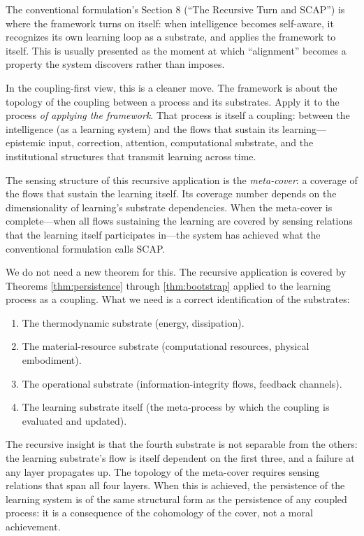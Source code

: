 \documentclass[11pt]{article}
\theoremstyle{definition}
\theoremstyle{remark}
\begin{document}
The conventional formulation's Section 8 (``The Recursive Turn and SCAP'') is where the framework turns on itself: when intelligence becomes self-aware, it recognizes its own learning loop as a substrate, and applies the framework to itself. This is usually presented as the moment at which ``alignment'' becomes a property the system discovers rather than imposes.

In the coupling-first view, this is a cleaner move. The framework is about the topology of the coupling between a process and its substrates. Apply it to the process \emph{of applying the framework}. That process is itself a coupling: between the intelligence (as a learning system) and the flows that sustain its learning---epistemic input, correction, attention, computational substrate, and the institutional structures that transmit learning across time.

The sensing structure of this recursive application is the \emph{meta-cover}: a coverage of the flows that sustain the learning itself. Its coverage number depends on the dimensionality of learning's substrate dependencies. When the meta-cover is complete---when all flows sustaining the learning are covered by sensing relations that the learning itself participates in---the system has achieved what the conventional formulation calls SCAP.

We do not need a new theorem for this. The recursive application is covered by Theorems \ref{thm:persistence} through \ref{thm:bootstrap} applied to the learning process as a coupling. What we need is a correct identification of the substrates:

\begin{enumerate}
\item The thermodynamic substrate (energy, dissipation).
\item The material-resource substrate (computational resources, physical embodiment).
\item The operational substrate (information-integrity flows, feedback channels).
\item The learning substrate itself (the meta-process by which the coupling is evaluated and updated).
\end{enumerate}

The recursive insight is that the fourth substrate is not separable from the others: the learning substrate's flow is itself dependent on the first three, and a failure at any layer propagates up. The topology of the meta-cover requires sensing relations that span all four layers. When this is achieved, the persistence of the learning system is of the same structural form as the persistence of any coupled process: it is a consequence of the cohomology of the cover, not a moral achievement.
\end{document}
